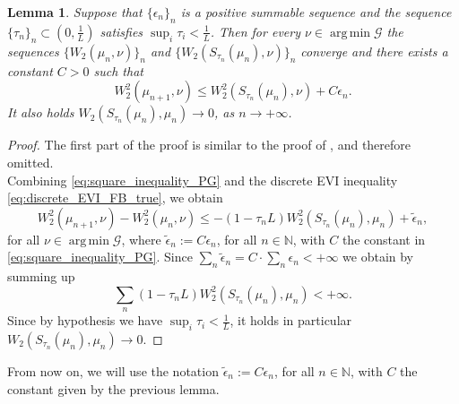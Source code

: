 \documentclass[11pt]{article}
\DeclareMathOperator*{\argmin}{arg\,min}
\newtheorem{lemma}[theorem]{Lemma}
\newcommand{\cG}{\mathcal{G}}
\newcommand{\cT}{S}
\newcommand{\N}{\mathbb{N}}
\numberwithin{equation}{section}
\begin{document}
\begin{lemma}
	Suppose that $\{\epsilon_n\}_n$ is a positive summable sequence and the sequence $\{\tau_n\}_n \subset \left(0,\frac{1}{L}\right)$ satisfies $\sup_i \tau_i < \frac{1}{L}$. Then for every $\nu \in \argmin \cG$ the sequences $\{W_2(\mu_n,\nu)\}_n$ and $\{W_2(\cT_{\tau_n}(\mu_n),\nu)\}_n$ converge and there exists a constant $C>0$ such that
	\begin{equation}\label{eq:square_inequality_PG}
		W_2^2(\mu_{n+1},\nu)\leq W_2^2(\cT_{\tau_n}(\mu_n),\nu)+C\epsilon_n.
	\end{equation}
	It also holds $W_2(\cT_{\tau_n}(\mu_n),\mu_n)\to 0$, as $n\to +\infty$.
\end{lemma}
\begin{proof}
	The first part of the proof is similar to the proof of , and therefore omitted.\\
	Combining \eqref{eq:square_inequality_PG} and the discrete EVI inequality \eqref{eq:discrete_EVI_FB_true}, we obtain
	\begin{equation*}
		W_2^2(\mu_{n+1},\nu) - W_2^2(\mu_n,\nu) \leq - (1-\tau_n L) W_2^2(\cT_{\tau_n}(\mu_n),\mu_n) +\tilde{\epsilon}_n,
	\end{equation*}
	for all $\nu \in \argmin \cG$, where $\tilde{\epsilon}_n := C \epsilon_n$, for all $n\in \N$, with $C$ the constant in \eqref{eq:square_inequality_PG}. Since $\sum_n \tilde{\epsilon}_n = C \cdot \sum_n \epsilon_n <+\infty$ we obtain by summing up
	\begin{equation}
		\sum_n (1-\tau_nL)W_2^2(\cT_{\tau_n}(\mu_n),\mu_n)<+\infty.
	\end{equation}
	Since by hypothesis we have $\sup_i \tau_i < \frac{1}{L}$, it holds in particular $W_2(\cT_{\tau_n}(\mu_n),\mu_n)\to 0$.
\end{proof}

From now on, we will use the notation $\tilde{\epsilon}_n := C \epsilon_n$, for all $n\in \N$, with $C$ the constant given by the previous lemma.
\end{document}
